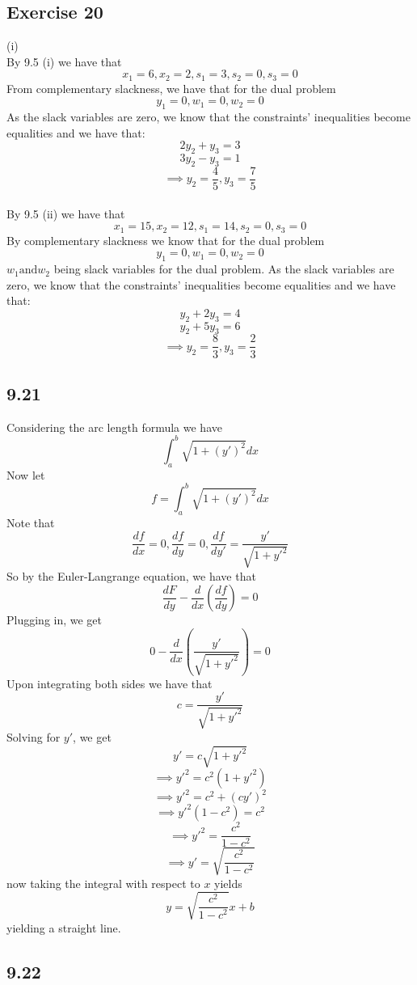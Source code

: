 \documentclass[letterpaper,12pt]{article}
\theoremstyle{definition}
\begin{document}
\subsection*{Exercise 20}
(i) \\
By 9.5 (i) we have that 
\[x_1 = 6, x_2 = 2, s_1 = 3, s_2 = 0, s_3 = 0\]
From complementary slackness, we have that for the dual problem 
\[y_1 = 0, w_1 = 0, w_2 = 0\] 
As the slack variables are zero, we know that the constraints' inequalities become equalities and we have that:
\[2y_2 + y_3 = 3 \]
\[3y_2 - y_3 = 1\]
\[\implies y_2 = \frac{4}{5}, y_3 = \frac{7}{5}\]
\\

By 9.5 (ii) we have that \[x_1 = 15, x_2 = 12, s_1 = 14, s_2 = 0, s_3 = 0\]
By complementary slackness we know that for the dual problem \[y_1 = 0, w_1 = 0, w_2 = 0\]
$w_1 \text{and} w_2$ being slack variables for the dual problem. As the slack variables are zero, we know that the constraints' inequalities become equalities and we have that:
\[y_2 + 2y_3 = 4 \]
\[y_2 + 5y_3 = 6\]
\[ \implies y_2 = \frac{8}{3}, y_3 = \frac{2}{3}\]

\subsection*{9.21}

Considering the arc length formula we have
\[\int_a^b \sqrt{1+(y')^2}dx\]
Now let
\[f=\int_a^b \sqrt{1+(y')^2}dx\]
Note that
\[\frac{df}{dx}=0, \frac{df}{dy}=0, \frac{df}{dy'}=\frac{y'}{\sqrt{1+y'^2}}\]
So by the Euler-Langrange equation, we have that
\[\frac{dF}{dy}-\frac{d}{dx}\left(\frac{df}{dy}\right)=0\]
Plugging in, we get
\[0-\frac{d}{dx}\left(\frac{y'}{\sqrt{1+y'^2}}\right)=0\]
Upon integrating both sides we have that
\[c = \frac{y'}{\sqrt{1+y'^2}}\]
Solving for $y'$, we get
\[y'=c\sqrt{1+y'^2}\]\[ \implies y'^2=c^2\left(1+y'^2\right)\]\[ \implies y'^2=c^2+(cy')^2\]
\[\implies y'^2(1-c^2)=c^2 \]\[\implies y'^2=\frac{c^2}{1-c^2} \]\[\implies y'=\sqrt{\frac{c^2}{1-c^2}}\]
now taking the integral with respect to $x$ yields
\[y=\sqrt{\frac{c^2}{1-c^2}}x+b\]
yielding a straight line.\\

\subsection*{9.22}
\end{document}

